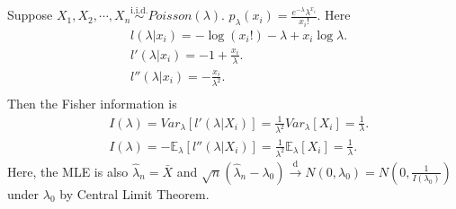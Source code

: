 \documentclass[a4paper]{article}
\begin{document}
\begin{eg}
	Suppose $X_1,X_2,\cdots,X_n \stackrel{\text{i.i.d.}}{\sim} Poisson(\lambda)$. $p_{\lambda}(x_i) = \frac{e^{-\lambda}\lambda^{x_i}}{x_i!}$. Here
	\begin{equation*}
		\begin{aligned}
			& l(\lambda|x_i) = -\log (x_i!) - \lambda + x_i \log \lambda. \\
			& l'(\lambda|x_i) = -1 + \frac{x_i}{\lambda}. \\
			& l''(\lambda|x_i) = -\frac{x_i}{\lambda^2}. \\
		\end{aligned}
	\end{equation*}
	Then the Fisher information is
	\begin{equation*}
		\begin{aligned}
			& I(\lambda) = Var_{\lambda}[l'(\lambda|X_i)] = \frac{1}{\lambda^2} Var_{\lambda}[X_i] = \frac{1}{\lambda}. \\
			& I(\lambda) = -\mathbb{E}_{\lambda}[l''(\lambda|X_i)] = \frac{1}{\lambda^2} \mathbb{E}_{\lambda}[X_i] = \frac{1}{\lambda}.
		\end{aligned}
	\end{equation*}
	Here, the MLE is also $\hat{\lambda}_n = \bar{X}$ and $\sqrt{n}(\hat{\lambda}_n - \lambda_0) \stackrel{\text{d}}{\longrightarrow} N(0,\lambda_0) = N(0,\frac{1}{I(\lambda_0)})$ under $\lambda_0$ by Central Limit Theorem.
\end{eg}
\end{document}
